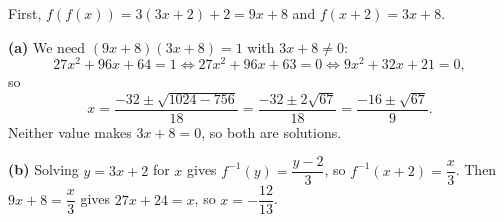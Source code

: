 First, $f(f(x))=3(3x+2)+2=9x+8$ and $f(x+2)=3x+8$.

\textbf{(a)} We need $(9x+8)(3x+8)=1$ with $3x+8\ne0$:
\[27x^2+96x+64=1\iff27x^2+96x+63=0\iff9x^2+32x+21=0,\]
so
\[x=\dfrac{-32\pm\sqrt{1024-756}}{18}=\dfrac{-32\pm2\sqrt{67}}{18}=\boxed{\dfrac{-16\pm\sqrt{67}}{9}}.\]
Neither value makes $3x+8=0$, so both are solutions.

\textbf{(b)} Solving $y=3x+2$ for $x$ gives $f^{-1}(y)=\dfrac{y-2}{3}$, so $f^{-1}(x+2)=\dfrac x3$. Then $9x+8=\dfrac x3$ gives $27x+24=x$, so $x=\boxed{-\dfrac{12}{13}}$.
